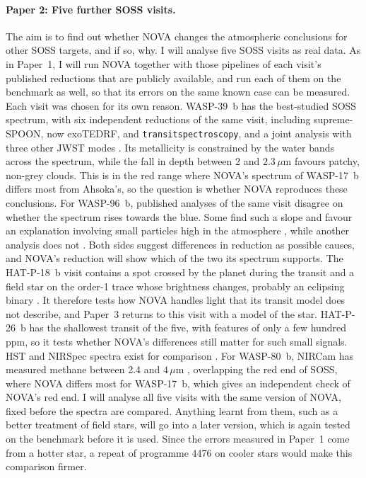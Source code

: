 \paragraph{Paper 2: Five further SOSS visits.} The aim is to find out whether
NOVA changes the atmospheric conclusions for other SOSS targets, and if so,
why. I will analyse five SOSS visits as real data. As in Paper~1, I will run
NOVA together with those pipelines of each visit's published reductions that
are publicly available, and run each of them on the benchmark as well, so that its errors on the same known case can be measured. Each visit was chosen for its own reason. WASP-39~b has
the best-studied SOSS spectrum, with six independent reductions of the same
visit, including supreme-SPOON, now exoTEDRF, and \texttt{transitspectroscopy},
and a joint analysis with three other JWST modes
\citep{FeinsteinEtAl2023,CarterEtAl2024}. Its metallicity is constrained by the water bands across the spectrum, while the fall in depth between 2 and $2.3\,\mu\mathrm{m}$ favours patchy, non-grey clouds. This is in the red range where NOVA's spectrum of WASP-17~b differs most from Ahsoka's, so the question is whether NOVA reproduces these conclusions. For WASP-96~b, published
analyses of the same visit disagree on whether the spectrum rises towards the
blue. Some find such a slope \citep{RadicaEtAl2023,TaylorEtAl2023,RadicaEtAl2026}
and favour an explanation involving small particles high in the atmosphere
\citep{TaylorEtAl2023,RadicaEtAl2026}, while another analysis does not
\citep{WangEtAl2026}. Both sides suggest differences in reduction as possible causes, and NOVA's reduction will show which of the two its spectrum supports.
The HAT-P-18~b visit contains a spot crossed by the planet during the transit
and a field star on the order-1 trace whose brightness changes, probably an
eclipsing binary \citep{FuEtAl2022}. It therefore tests how NOVA handles light
that its transit model does not describe, and Paper~3 returns to this visit
with a model of the star. HAT-P-26~b has the shallowest transit of the five,
with features of only a few hundred ppm, so it tests whether NOVA's
differences still matter for such small signals. HST and NIRSpec spectra exist
for comparison \citep{WakefordEtAl2017,GressierEtAl2025}. For WASP-80~b, NIRCam
has measured methane between 2.4 and $4\,\mu\mathrm{m}$ \citep{BellEtAl2023},
overlapping the red end of SOSS, where NOVA differs most for WASP-17~b, which
gives an independent check of NOVA's red end. I will analyse all five visits
with the same version of NOVA, fixed before the spectra are compared. Anything
learnt from them, such as a better treatment of field stars, will go into a
later version, which is again tested on the benchmark before it is used. Since
the errors measured in Paper~1 come from a hotter star, a repeat of programme
4476 on cooler stars would make this comparison firmer.


